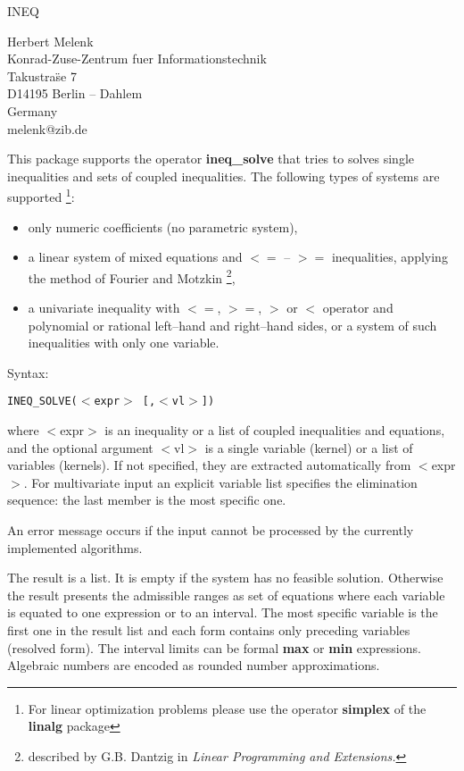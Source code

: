 
\begin{center} {\Large INEQ} \end{center}

\begin{center} Herbert Melenk \\ Konrad-Zuse-Zentrum fuer
Informationstechnik \\
Takustra\"se 7 \\ 
D14195 Berlin -- Dahlem\\ Germany \\ 
melenk@zib.de \end{center}

This package supports the operator {\bf ineq\_solve} that 
tries to solves single inequalities and sets of coupled inequalities.
The following types of systems are supported
\footnote{For linear optimization problems please use the operator
{\bf simplex} of the {\bf linalg} package}:
\begin{itemize}
\item only numeric coefficients (no parametric system),
\item a linear system of mixed equations and $<=$ -- $>=$ 
     inequalities, applying the method of Fourier and Motzkin
     \footnote{described by G.B. Dantzig in {\em Linear Programming 
      and Extensions.}},
\item a univariate inequality with $<=$, $>=$, $>$ or $<$ operator
     and polynomial or rational left--hand and right--hand sides,
     or a system of such inequalities with only one variable.
\end{itemize}

Syntax:
\begin{center}
{\tt INEQ\_SOLVE($<$expr$>$ [,$<$vl$>$])}
\end{center}
where $<$expr$>$ is an inequality or a list of coupled inequalities
and equations, and the optional argument $<$vl$>$ is a single
variable (kernel) or a list of variables (kernels). If not
specified, they are extracted automatically from $<$expr$>$.
For multivariate input an explicit variable list specifies the
elimination sequence: the last member is the most specific one.

An error message occurs if the input cannot be processed by the
currently implemented algorithms.

The result is a list. It is empty if the system has no feasible solution.
Otherwise the result presents the admissible ranges as set
of equations where each variable is equated to 
one expression or to an interval. 
The most specific variable is the first one in the result list and
each form contains only preceding variables (resolved form).
The interval limits can be formal {\bf max} or {\bf min} expressions.
Algebraic numbers are encoded as rounded number approximations.

